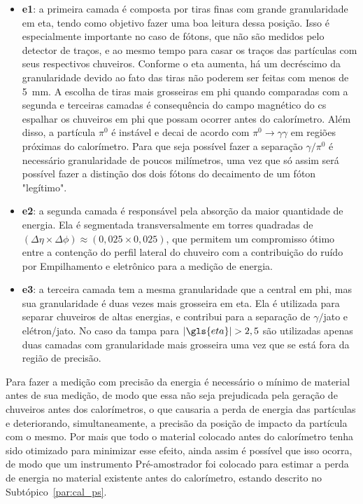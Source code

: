 \begin{itemize}
\item \textbf{\gls{e1}}: a primeira camada é composta por tiras
finas com grande granularidade em \gls{eta}, tendo como objetivo fazer uma
boa leitura dessa posição. Isso é especialmente importante no caso de fótons,
que não são medidos pelo detector de traços, e ao mesmo tempo para casar os
traços das partículas com seus respectivos chuveiros. Conforme o \gls{eta} aumenta,
há um decréscimo da granularidade devido ao fato das tiras não poderem ser feitas com menos de 5~mm.
A escolha de tiras mais grosseiras em \gls{phi} quando comparadas com a segunda e 
terceiras camadas é consequência do campo magnético do \gls{cs} espalhar os
chuveiros em \gls{phi} que possam ocorrer antes do calorímetro.
Além disso, a partícula $\pi^0$ é instável e decai de acordo com
$\pi^0\rightarrow\gamma\gamma$ em regiões próximas do calorímetro. Para que seja
possível fazer a separação $\gamma/\pi^0$ é necessário granularidade de
poucos milímetros, uma vez que só assim será possível fazer a distinção dos dois
fótons do decaimento de um fóton "legítimo". 
\item \textbf{\gls{e2}}: a segunda camada é responsável pela
absorção da maior quantidade de energia. Ela é segmentada transversalmente em
torres quadradas de $(\Delta\eta\times\Delta\phi)\approx(0,025\times0,025)$, que
permitem um compromisso ótimo entre a contenção do perfil lateral do chuveiro
com a contribuição do ruído por Empilhamento e eletrônico para a medição de
energia.
\item \textbf{\gls{e3}}: a terceira camada tem a mesma
granularidade que a central em \gls{phi}, mas sua granularidade é duas vezes mais grosseira
em \gls{eta}. Ela é utilizada para separar chuveiros de altas energias, e
contribui para a separação de $\gamma/$jato e elétron/jato. No caso da tampa
para $|\gls{eta}|>2,5$ são utilizadas apenas duas camadas com granularidade mais
grosseira uma vez que se está fora da região de precisão.
\end{itemize}

Para fazer a medição com precisão da energia é necessário o mínimo de material 
antes de sua medição, de modo que essa não seja prejudicada pela geração de
chuveiros antes dos calorímetros, o que causaria a perda de energia das
partículas e deteriorando, simultaneamente, a precisão da posição de impacto 
da partícula com o mesmo. Por mais que todo o material colocado antes do
calorímetro tenha sido otimizado para minimizar esse efeito, ainda assim é
possível que isso ocorra, de modo que um instrumento Pré-amostrador foi colocado 
para estimar a perda de energia no material existente antes do calorímetro, 
estando descrito no Subtópico~\ref{par:cal_ps}.

